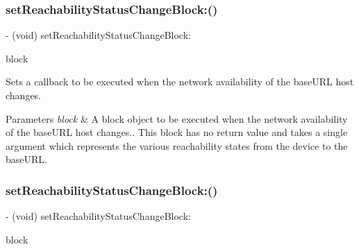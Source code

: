 \subsubsection{\texorpdfstring{set\+Reachability\+Status\+Change\+Block\+:()}{setReachabilityStatusChangeBlock:()}\hspace{0.1cm}{\footnotesize\ttfamily [2/3]}}
{\footnotesize\ttfamily -\/ (void) set\+Reachability\+Status\+Change\+Block\+: \begin{DoxyParamCaption}\item[{(nullable void($^\wedge$)(A\+F\+Network\+Reachability\+Status status))}]{block }\end{DoxyParamCaption}}

Sets a callback to be executed when the network availability of the {\ttfamily base\+U\+RL} host changes.


\begin{DoxyParams}{Parameters}
{\em block} & A block object to be executed when the network availability of the {\ttfamily base\+U\+RL} host changes.. This block has no return value and takes a single argument which represents the various reachability states from the device to the {\ttfamily base\+U\+RL}. \\
\hline
\end{DoxyParams}
\mbox{\label{interface_a_f_network_reachability_manager_ad0cbd4cc75749ec8e6ee383b91ae51bd}} 
\subsubsection{\texorpdfstring{set\+Reachability\+Status\+Change\+Block\+:()}{setReachabilityStatusChangeBlock:()}\hspace{0.1cm}{\footnotesize\ttfamily [3/3]}}
{\footnotesize\ttfamily -\/ (void) set\+Reachability\+Status\+Change\+Block\+: \begin{DoxyParamCaption}\item[{(nullable void($^\wedge$)(A\+F\+Network\+Reachability\+Status status))}]{block }\end{DoxyParamCaption}}

